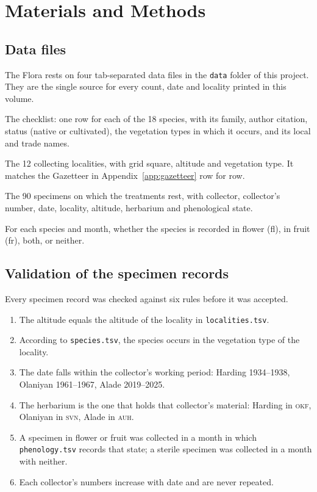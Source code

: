 \chapter{Materials and Methods}

\section{Data files}
The Flora rests on four tab-separated data files in the \texttt{data}
folder of this project. They are the single source for every count,
date and locality printed in this volume.

\begin{description}[style=nextline,leftmargin=2em]
	\item[\texttt{data/species.tsv}] The checklist: one row for each of
	the 18 species, with its family, author citation, status (native or
	cultivated), the vegetation types in which it occurs, and its local
	and trade names.
	\item[\texttt{data/localities.tsv}] The 12 collecting localities, with
	grid square, altitude and vegetation type. It matches the Gazetteer
	in Appendix~\ref{app:gazetteer} row for row.
	\item[\texttt{data/specimens.tsv}] The 90 specimens on which the
	treatments rest, with collector, collector's number, date, locality,
	altitude, herbarium and phenological state.
	\item[\texttt{data/phenology.tsv}] For each species and month, whether
	the species is recorded in flower (fl), in fruit (fr), both, or
	neither.
\end{description}

\section{Validation of the specimen records}
Every specimen record was checked against six rules before it was
accepted.
\begin{enumerate}[label=\arabic*.]
	\item The altitude equals the altitude of the locality in
	\texttt{localities.tsv}.
	\item According to \texttt{species.tsv}, the species occurs in the
	vegetation type of the locality.
	\item The date falls within the collector's working period: Harding
	1934--1938, Olaniyan 1961--1967, Alade 2019--2025.
	\item The herbarium is the one that holds that collector's material:
	Harding in \textsc{okf}, Olaniyan in \textsc{svn}, Alade in
	\textsc{auh}.
	\item A specimen in flower or fruit was collected in a month in which
	\texttt{phenology.tsv} records that state; a sterile specimen was
	collected in a month with neither.
	\item Each collector's numbers increase with date and are never
	repeated.
\end{enumerate}

